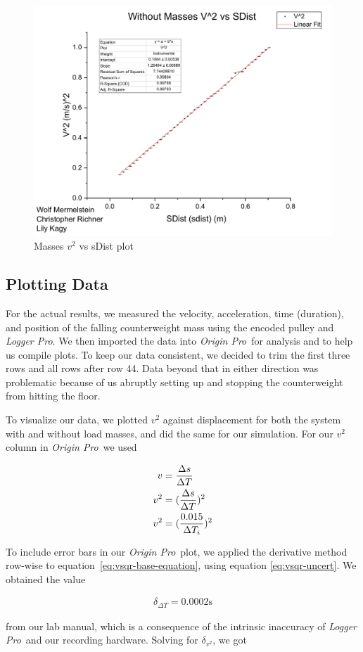 \documentclass[coverpage]{article}
\newcommand{\softwareText}[1]{\textit{#1}\texttrademark}
\newcommand{\loggerpro}{\softwareText{Logger Pro}}
\newcommand{\origin}{\softwareText{Origin Pro}}
\begin{document}
	\begin{figure}[h]
		\centering
		\caption{Masses $v^2$ vs sDist plot}
		\includegraphics[width=.5\textwidth]{plots/withMassesPlot.pdf}
	\end{figure}
	
	\subsection{Plotting Data}
	
	For the actual results, we measured the velocity,  acceleration, time (duration), and position of the falling counterweight mass using the encoded pulley and \loggerpro. We then imported the data into \origin~for analysis and to help us compile plots. To keep our data consistent, we decided to trim the first three rows and all rows after row 44. Data beyond that in either direction was problematic because of us abruptly setting up and stopping the counterweight from hitting the floor.
	
	To visualize our data, we plotted $v^2$ against displacement for both the system with and without load masses, and did the same for our simulation. For our $v^2$ column in \origin~we used
	
	\begin{align}
		v&=\frac{\Delta{s}}{\Delta{T}} \notag \\
		v^2&=(\frac{\Delta{s}}{\Delta{T}})^2 \notag \\
		v^2&=(\frac{0.015}{\Delta{T}_i})^2 \label{eq:vsqr-base-equation}
	\end{align}

	To include error bars in our \origin~plot, we applied the derivative method row-wise to equation~\ref{eq:vsqr-base-equation}, using equation \ref{eq:vsqr-uncert}. We obtained the value
	
	\begin{align}
		\delta_{\Delta{T}} = 0.0002 \text{s}
	\end{align}

	from our lab manual, which is a consequence of the intrinsic inaccuracy of \loggerpro~and our recording hardware. Solving for $\delta_{v^2}$, we got
	 
\end{document}

